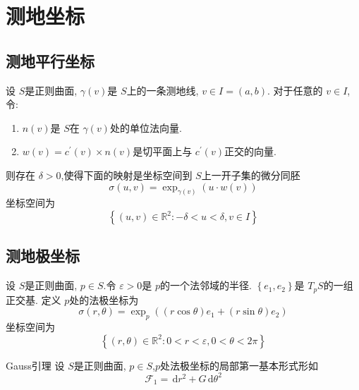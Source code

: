 \documentclass[../../main.tex]{subfiles}
\begin{document}
\chapter{ 测地坐标 }
\section{测地平行坐标}
\begin{definition}
    设 \(  S  \)是正则曲面, \(   \gamma \left( v \right)   \)是 \(  S  \)上的一条测地线, \(  v\in I= \left( a,b \right)   \).
    对于任意的 \(  v\in I  \),令:
    \begin{enumerate}
        \item  \(  n\left( v \right)   \)是 \(  S  \)在 \(   \gamma \left( v \right)   \)处的单位法向量.       
        \item \(  w\left( v \right)= c^{\prime} \left( v \right)\times n\left( v \right)     \)是切平面上与 \(  c^{\prime} \left( v \right)   \)正交的向量.   
    \end{enumerate}
     则存在 \(   \delta  > 0  \),使得下面的映射是坐标空间到 \(  S  \)上一开子集的微分同胚 \[
      \sigma \left( u,v \right)= \exp _{ \gamma \left( v \right) }\left( u\cdot w\left( v \right)  \right)  
     \]  坐标空间为 \[
     \left\{ \left( u,v \right)\in \mathbb{R} ^{2}:- \delta  < u<  \delta  ,v\in I  \right\}
     \]
\end{definition}
\section{测地极坐标}
\begin{definition}
    设 \(  S  \)是正则曲面, \(  p \in S  \).令 \(   \varepsilon > 0  \)是 \(  p  \)的一个法邻域的半径. \(  \left\{ e_1,e_2 \right\}  \)是 \(  T_{p}S  \)的一组正交基.
    定义 \(  p  \)处的法极坐标为 \[
     \sigma \left( r, \theta  \right) =  \exp _{p}\left( \left( r\cos  \theta  \right)  e_1+ \left( r\sin  \theta  \right)e_2 \right)  
    \]   坐标空间为 \[
    \left\{ \left( r, \theta  \right)\in \mathbb{R} ^{2}: 0< r<  \varepsilon ,0<  \theta < 2\pi   \right\}
    \]
\end{definition}

\begin{lemma}{Gauss引理}
    设 \(  S  \)是正则曲面, \(  p \in S  \),\(  p  \)处法极坐标的局部第一基本形式形如 \[
    \mathcal{F}_{1}= \,\mathrm{d} r^{2}+ G\,\mathrm{d}  \theta ^{2}
    \]   
\end{lemma}
\end{document}

